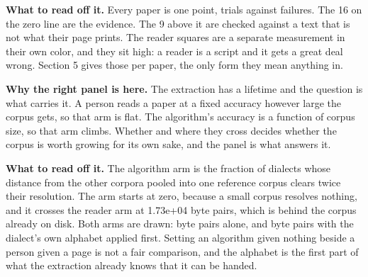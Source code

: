 \textbf{What to read off it.} Every paper is one point, trials against failures. The 16 on the zero line are the evidence. The 9 above it are checked against a text that is not what their page prints. The reader squares are a separate measurement in their own color, and they sit high: a reader is a script and it gets a great deal wrong. Section 5 gives those per paper, the only form they mean anything in.

\textbf{Why the right panel is here.} The extraction has a lifetime and the question is what carries it. A person reads a paper at a fixed accuracy however large the corpus gets, so that arm is flat. The algorithm's accuracy is a function of corpus size, so that arm climbs. Whether and where they cross decides whether the corpus is worth growing for its own sake, and the panel is what answers it.

\textbf{What to read off it.} The algorithm arm is the fraction of dialects whose distance from the other corpora pooled into one reference corpus clears twice their resolution. The arm starts at zero, because a small corpus resolves nothing, and it crosses the reader arm at 1.73e+04 byte pairs, which is behind the corpus already on disk. Both arms are drawn: byte pairs alone, and byte pairs with the dialect's own alphabet applied first. Setting an algorithm given nothing beside a person given a page is not a fair comparison, and the alphabet is the first part of what the extraction already knows that it can be handed.

